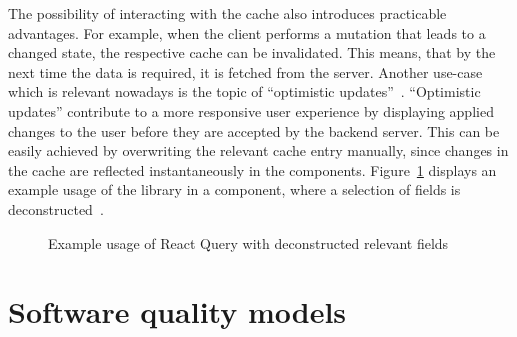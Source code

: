 The possibility of interacting with the cache also introduces
practicable advantages. For example, when the client performs a mutation
that leads to a changed state, the respective cache can be invalidated. This
means, that by the next time the data is required, it is fetched
from the server. Another use-case which is relevant nowadays is the
topic of ``optimistic updates''~\cite{react_query_optimistic_updates}. ``Optimistic updates''
contribute to a more responsive user experience by displaying applied
changes to the user before they are accepted by the backend server. This can be
easily achieved by overwriting the relevant cache entry manually, since
changes in the cache are reflected instantaneously in the components.
Figure~\ref{code_react_query_use_query} displays an example usage of the library in a component,
where a selection of fields is deconstructed~\cite{mozilla_deconstructing}.

\begin{figure}
\begin{Shaded}
\begin{Highlighting}[]
\NormalTok{)}
\end{Highlighting}
\end{Shaded}
\caption{Example usage of React Query with deconstructed relevant fields}
\label{code_react_query_use_query}
\end{figure}

\clearpage
\hypertarget{software-quality-models}{%
\chapter{Software quality models}\label{software-quality-models}}

